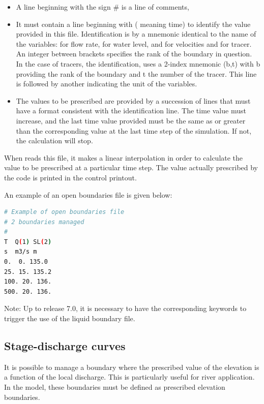 \begin{itemize}
\item A line beginning with the sign \# is a line of comments,

\item It must contain a line beginning with  ( meaning
time) to identify the value provided in this file.
Identification is by a mnemonic identical to the name of the variables:
 for flow rate,  for water level,  and
 for velocities and  for tracer.
An integer between brackets specifies the rank of the boundary in question.
In the case of tracers, the identification, uses a 2-index mnemonic
(b,t) with b providing the rank of the boundary and t the number of
the tracer.
This line is followed by another indicating the unit of the variables.

\item The values to be prescribed are provided by a succession of lines
that must have a format consistent with the identification line.
The time value must increase, and the last time value provided must be the same
as or greater than the corresponding value at the last time step of the
simulation.
If not, the calculation will stop.
\end{itemize}

When  reads this file, it makes a linear interpolation in order to
calculate the value to be prescribed at a particular time step.
The value actually prescribed by the code is printed in the control printout.

An example of an open boundaries file is given below:
\begin{lstlisting}[language=bash]
# Example of open boundaries file
# 2 boundaries managed
#
T  Q(1) SL(2)
s  m3/s m
0.  0. 135.0
25. 15. 135.2
100. 20. 136.
500. 20. 136.
\end{lstlisting}
\begin{WarningBlock}{Note:}
Up to release 7.0, it is necessary to have the corresponding keywords
 to trigger the use of the liquid boundary file.
\end{WarningBlock}

\subsection{Stage-discharge curves}
\label{subs:stage:dis:curve}
It is possible to manage a boundary where the prescribed value of the elevation
is a function of the local discharge.
This is particularly useful for river application.
In the model, these boundaries must be defined as prescribed elevation boundaries.

